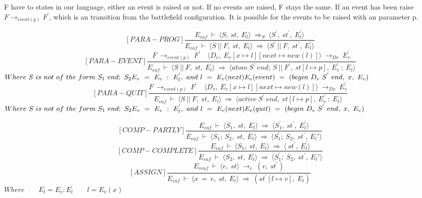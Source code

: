 F have to states in our language, either an event is raised or not. If no events are raised, F stays the same. If an event has been raise \begin{math} F \rightarrow_{event(p)} F^{'} \end{math}, which is an transition from the battlefield configuration. It is possible for the events to be raised with an parameter p. 

\[	
[PARA-PROG]	
\dfrac{E_{eaf} \ \vdash \ \langle S, \ st, \ E_l \rangle \ \Rightarrow_S \ \langle S^{'}, \ st^{'}, \ E_l^{'} \rangle}{E_{eaf} \ \vdash \ \langle S \ || \ F, \ st, \ E_l \rangle \ \Rightarrow \ \langle S^{'} \ || \ F, \ st^{'}, \ E_l^{'} \rangle}
\]\newline
\[	
[PARA-EVENT]	
\dfrac{F \ \rightarrow_{event(p)} \ F^{'} \quad \langle D_v, \ E_v[x \mapsto l][next \mapsto new(l)] \rangle \ \rightarrow_{Dv} \ E_v^{'}}{E_{eaf} \ \vdash \ \langle S \ || \ F, \ st, \ E_l \rangle \ \Rightarrow \ \langle atom \ S^{'} \ end; \ S \ || \ F^{'}, \ st[l \mapsto p], \ E_v^{'} \ : \ E_l \rangle}	
\]
\begin{math}		
Where \ S \ is \ not \ of \ the \ form \ S_1 \ end; \ S_2 \newline
E_v \ = \ E_v \ : \ E_l^{'}, \ and \ l \ = \ E_v(next) \newline	
E_e(event) \ = \ (begin \ D_v \ S^{'} \ end, \ x, \ E_v) \newline	
\end{math}
\[	
[PARA-QUIT]	
\dfrac{F \ \rightarrow_{event(p)} \ F^{'} \quad \langle D_v, \ E_v[x \mapsto l][next \mapsto new(l)] \rangle \ \rightarrow_{Dv} \ E_v^{'}}{E_{eaf} \ \vdash \ \langle S \ || \ F, \ st, \ E_l \rangle \ \Rightarrow \ \langle active \ S^{'} \ end, \ st[l \mapsto p], \ E_v^{'} \ : \ E_l \rangle}	
\]
\begin{math}		
	Where \ S \ is \ not \ of \ the \ form \ S_1 \ end; \ S_2 \newline
	E_v \ = \ E_v \ : \ E_l^{'}, \ and \ l \ = \ E_v(next) \newline	
	E_e(quit) \ = \ (begin \ D_v \ S^{'} \ end, \ x, \ E_v) \newline	
\end{math}

\[
[COMP-PARTLY]
\dfrac{E_{eaf} \ \vdash \ \langle S_1, \ st, \ E_l \rangle \ \Rightarrow \ \langle S_1^{'}, \ st^{'}, \ E_l^{'} \rangle}{E_{eaf} \ \vdash \ \langle S_1; \ S_2, \ st, \ E_l \rangle \ \Rightarrow \ \langle S_1^{'}; \ S_2, \ st^{'}, \ E_l{'} \rangle}
\]\newline
\[
[COMP-COMPLETE]
\dfrac{E_{eaf} \ \vdash \ \langle S_1, \ st, \ E_l \rangle \ \Rightarrow \ \langle \ st^{'}, \ E_l^{'} \rangle}{E_{eaf} \ \vdash \ \langle S_2, \ st, \ E_l \rangle \ \Rightarrow \ \langle S_1^{'}; \ S_2, \ st^{'}, \ E_l{'} \rangle}
\]\newline
\[
[ASSIGN]
\dfrac{E_{veaf} \ \vdash \ \langle e, \ st \rangle \ \rightarrow_e \ (v, \ st^{'})}{E_{eaf} \ \vdash \ \langle x \ = \ e, \ st, \ E_l \rangle \ \Rightarrow \ (st^{'}[l \mapsto v], \ E_l)}
\]
\begin{math}
Where
\qquad E_l = E_v : E_l^{‘}
\qquad l = E_v(x)
\end{math}

